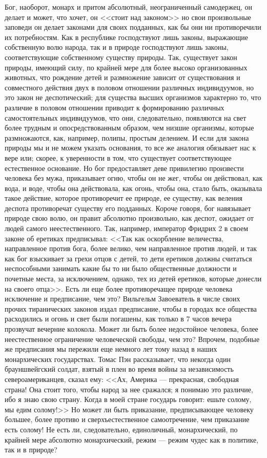 \documentclass[12pt]{article}
\begin{document}
Бог, наоборот, монарх и притом абсолютный, неограниченный самодержец, он делает и может, что хочет, он <<стоит над законом>>  но свои произвольные заповеди он делает законами для своих подданных, как бы они ни противоречили их потребностям. Как в республике господствуют лишь законы, выражающие собственную волю народа, так и в природе господствуют лишь законы, соответствующие собственному существу природы. Так, существует закон природы, имеющий силу, по крайней мере для более высоко организованных животных, что рождение детей и размножение зависит от существования и совместного действия двух в половом отношении различных индивидуумов, но это закон не деспотический; для существа высших организмов характерно то, что различие в половом отношении приводит к формированию различных самостоятельных индивидуумов, что они, следовательно, появляются на свет более трудным и опосредствованным образом, чем низшие организмы, которые размножаются, как, например, полипы, простым делением. И если для закона природы мы и не можем указать основания, то все же аналогия обязывает нас к вере или; скорее, к уверенности в том, что существует соответствующее естественное основание. Но бог предоставляет деве привилегию произвести человека без мужа, приказывает огню, чтобы он не жег, чтобы он действовал, как вода, и воде, чтобы она действовала, как огонь, чтобы она, стало быть, оказывала такое действие, которое противоречит ее природе, ее существу, как веления деспота противоречат существу его подданных. Короче говоря, бог навязывает природе свою волю, он правит абсолютно произвольно, как деспот, ожидает от людей самого неестественного. Так, например, император Фридрих 2 в своем законе об еретиках предписывал: <<Так как оскорбление величества, направленное против бога, более велико, чем направленное против людей, и так как бог взыскивает за грехи отцов с детей, то дети еретиков должны считаться неспособными занимать какие бы то ни было общественные должности и почетные места, за исключением, однако, тех из детей еретиков, которые донесли на своего отца>>. Есть ли еще более противоречащее природе человека исключение и предписание, чем это? Вильгельм Завоеватель в числе своих прочих тиранических законов издал предписание, чтобы в городах все общества расходились и огонь и свет были погашены, как только в 7 часов вечера прозвучат вечерние колокола. Может ли быть более недостойное человека, более неестественное ограничение человеческой свободы, чем это? Впрочем, подобные же предписания мы пережили еще немного лет тому назад в наших монархических государствах. Томас Пэн рассказывает, что некогда один брауншвейгский солдат, взятый в плен во время войны за независимость североамериканцев, сказал ему: <<Ах, Америка --- прекрасная, свободная страна! Она стоит того, чтобы народ за нее сражался; я понимаю это различие, ибо я знаю свою страну. Когда в моей стране государь говорит: ешьте солому, мы едим солому!>> Но может ли быть приказание, предписывающее человеку большее, более противо и сверхъестественное самоотречение, чем приказание есть солому! Не есть ли, следовательно, единоличный, монархический, по крайней мере абсолютно монархический, режим --- режим чудес как в политике, так и в природе? 
\end{document}

